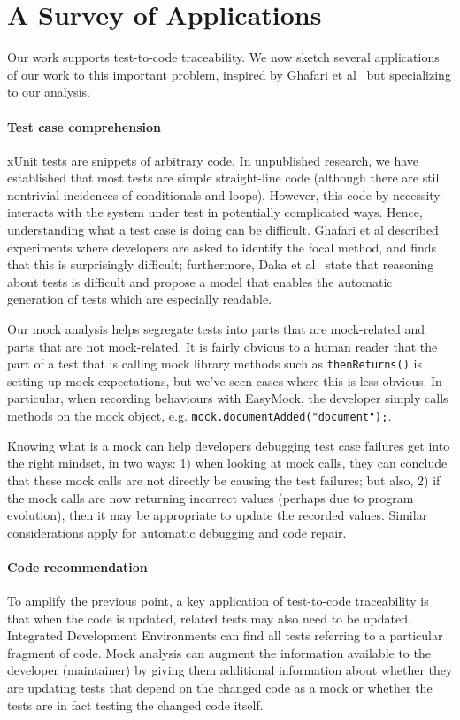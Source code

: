 \section{A Survey of Applications}
\label{sec:applications}

Our work supports test-to-code traceability. 
We now sketch several applications of our work to this important problem,
inspired by Ghafari et al~\cite{ghafari15:_autom} but specializing to
our analysis.

\paragraph{Test case comprehension} xUnit tests are snippets of arbitrary
code. In unpublished research, we have established that most tests are
simple straight-line code (although there are still nontrivial incidences of
conditionals and loops). However, this code by necessity interacts with
the system under test in potentially complicated ways. Hence,
understanding what a test case is doing can be difficult. Ghafari et
al described experiments where developers are asked to identify the
focal method, and finds that this is surprisingly difficult;
furthermore, Daka et al~\cite{daka15:_model_readab_improv_unit_tests}
state that reasoning about tests is difficult and propose a model that
enables the automatic generation of tests which are especially
readable.

Our mock analysis helps segregate tests into parts that are
mock-related and parts that are not mock-related.  It is fairly
obvious to a human reader that the part of a test that is calling mock
library methods such as \texttt{thenReturns()} is setting up mock
expectations, but we've seen cases where this is less
obvious. In particular, when recording behaviours with EasyMock,
the developer simply calls methods on the mock object, e.g. 
\texttt{mock.documentAdded("document");}.

Knowing what is a mock can help developers debugging test case
failures get into the right mindset, in two ways: 1) when looking at
mock calls, they can conclude that these mock calls are not
directly be causing the test failures; but also, 2) if the mock calls
are now returning incorrect values (perhaps due to program evolution),
then it may be appropriate to update the recorded values. Similar considerations
apply for automatic debugging and code repair.

\paragraph{Code recommendation}
To amplify the previous point, a key application of test-to-code
traceability is that when the code is updated, related tests may also
need to be updated. Integrated Development Environments can find
all tests referring to a particular fragment of code. Mock analysis
can augment the information available to the developer (maintainer) by
giving them additional information about whether they are updating
tests that depend on the changed code as a mock or whether the tests
are in fact testing the changed code itself.

